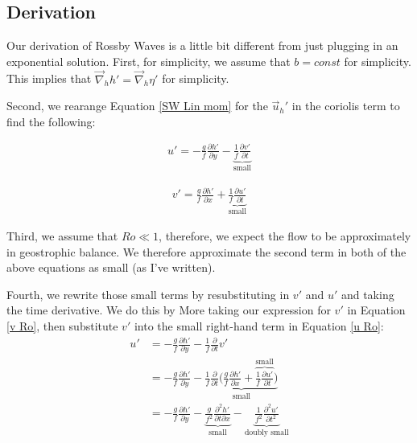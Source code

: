 \subsection{Derivation}

Our derivation of Rossby Waves is a little bit different from just plugging in an exponential solution. First, for simplicity, we assume that \(b=const\) for simplicity. This implies that \(\vec{\nabla}_h h'=\vec{\nabla}_h \eta'\) for simplicity. 

Second, we rearange Equation \ref{SW Lin mom} for the \(\vec{u}_h'\) in the coriolis term to find the following:

\begin{minipage}{.48\linewidth}
    \begin{align}
        \label{u Ro}
        u'=-\frac{g}{f}\frac{\partial h'}{\partial y}-\underbrace{\frac{1}{f}\frac{\partial v'}{\partial t}}_{\text{small}}
    \end{align}
\end{minipage}
\hfill
\begin{minipage}{.48\linewidth}
    \begin{align}
        \label{v Ro}
        v'=\frac{g}{f}\frac{\partial h'}{\partial x}+\underbrace{\frac{1}{f}\frac{\partial u'}{\partial t}}_\text{small}
    \end{align}
\end{minipage}

Third, we assume that \(Ro\ll 1\), therefore, we expect the flow to be approximately in geostrophic balance. We therefore approximate the second term in both of the above equations as small (as I've written).

Fourth, we rewrite those small terms by resubstituting in \(v'\) and \(u'\) and taking the time derivative. We do this by More taking our expression for \(v'\) in Equation \ref{v Ro}, then substitute \(v'\) into the small right-hand term in Equation \ref{u Ro}:
\begin{align*}
    u'&=-\frac{g}{f}\frac{\partial h'}{\partial y}-\frac{1}{f}\frac{\partial }{\partial t}v'\\
    &=-\frac{g}{f}\frac{\partial h'}{\partial y}-
    \underbrace{\frac{1}{f}\frac{\partial }{\partial t} \biggl( \frac{g}{f}\frac{\partial h'}{\partial x}+\overbrace{\frac{1}{f}\frac{\partial u'}{\partial t}}^\text{small} \biggr)}_\text{small}
    \\
    &=-\frac{g}{f}\frac{\partial h'}{\partial y}
    -\underbrace{\frac{g}{f^2}\frac{\partial^2 h' }{\partial t \partial x}}_\text{small}
    -\underbrace{\frac{1}{f^2}\frac{\partial^2 u'}{\partial t^2}}_\text{doubly small}
\end{align*}

